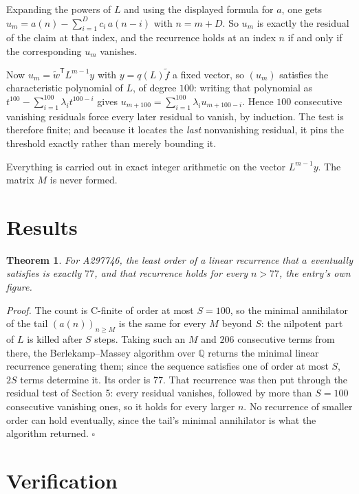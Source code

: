 \documentclass[11pt]{article}
\newtheorem{theorem}{Theorem}
\theoremstyle{definition}
\begin{document}
Expanding the powers of $L$ and using the displayed formula for $a$, one gets $u_m = a(n) - \sum_{i=1}^{D} c_i\,a(n-i)$ with $n = m + D$. So $u_m$ is exactly the residual of the claim at that index, and the recurrence holds at an index $n$ if and only if the corresponding $u_m$ vanishes.

Now $u_m = \tilde w^{\mathsf T} L^{m-1} y$ with $y = q(L)\tilde f$ a fixed vector, so $(u_m)$ satisfies the characteristic polynomial of $L$, of degree $100$: writing that polynomial as $t^{100} - \sum_{i=1}^{100} \lambda_i t^{100-i}$ gives $u_{m+100} = \sum_{i=1}^{100} \lambda_i u_{m+100-i}$. Hence $100$ consecutive vanishing residuals force every later residual to vanish, by induction. The test is therefore finite; and because it locates the {\itshape last} nonvanishing residual, it pins the threshold exactly rather than merely bounding it.

Everything is carried out in exact integer arithmetic on the vector $L^{m-1}y$. The matrix $M$ is never formed.

\section{Results}

\begin{theorem} For A297746, the least order of a linear recurrence that $a$ eventually satisfies is exactly $77$, and that recurrence holds for every $n > 77$, the entry's own figure.\end{theorem}

{\itshape Proof.} The count is C-finite of order at most $S = 100$, so the minimal annihilator of the tail $(a(n))_{n \ge M}$ is the same for every $M$ beyond $S$: the nilpotent part of $L$ is killed after $S$ steps. Taking such an $M$ and $206$ consecutive terms from there, the Berlekamp--Massey algorithm over $\mathbb{Q}$ returns the minimal linear recurrence generating them; since the sequence satisfies one of order at most $S$, $2S$ terms determine it. Its order is $77$. That recurrence was then put through the residual test of Section 5: every residual vanishes, followed by more than $S = 100$ consecutive vanishing ones, so it holds for every larger $n$. No recurrence of smaller order can hold eventually, since the tail's minimal annihilator is what the algorithm returned. $\square$

\section{Verification}
\end{document}
